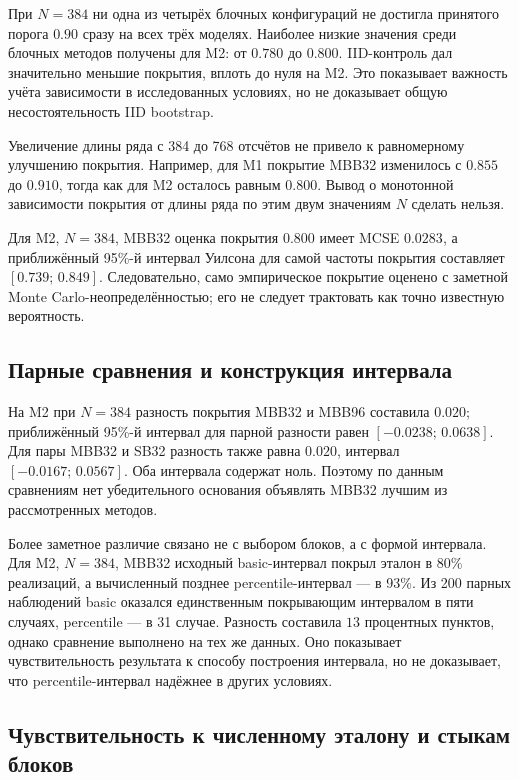 При $N=384$ ни одна из четырёх блочных конфигураций не достигла принятого порога $0.90$ сразу на всех трёх моделях. Наиболее низкие значения среди блочных методов получены для M2: от $0.780$ до $0.800$. IID-контроль дал значительно меньшие покрытия, вплоть до нуля на M2. Это показывает важность учёта зависимости в исследованных условиях, но не доказывает общую несостоятельность IID bootstrap.

Увеличение длины ряда с 384 до 768 отсчётов не привело к равномерному улучшению покрытия. Например, для M1 покрытие MBB32 изменилось с $0.855$ до $0.910$, тогда как для M2 осталось равным $0.800$. Вывод о монотонной зависимости покрытия от длины ряда по этим двум значениям $N$ сделать нельзя.

Для M2, $N=384$, MBB32 оценка покрытия $0.800$ имеет MCSE $0.0283$, а приближённый 95\%-й интервал Уилсона для самой частоты покрытия составляет $[0.739;\,0.849]$. Следовательно, само эмпирическое покрытие оценено с заметной Monte Carlo-неопределённостью; его не следует трактовать как точно известную вероятность.

\subsection{Парные сравнения и конструкция интервала}

На M2 при $N=384$ разность покрытия MBB32 и MBB96 составила $0.020$; приближённый 95\%-й интервал для парной разности равен $[-0.0238;\,0.0638]$. Для пары MBB32 и SB32 разность также равна $0.020$, интервал $[-0.0167;\,0.0567]$. Оба интервала содержат ноль. Поэтому по данным сравнениям нет убедительного основания объявлять MBB32 лучшим из рассмотренных методов.

Более заметное различие связано не с выбором блоков, а с формой интервала. Для M2, $N=384$, MBB32 исходный basic-интервал покрыл эталон в 80\% реализаций, а вычисленный позднее percentile-интервал --- в 93\%. Из 200 парных наблюдений basic оказался единственным покрывающим интервалом в пяти случаях, percentile --- в 31 случае. Разность составила $13$ процентных пунктов, однако сравнение выполнено на тех же данных. Оно показывает чувствительность результата к способу построения интервала, но не доказывает, что percentile-интервал надёжнее в других условиях.

\subsection{Чувствительность к численному эталону и стыкам блоков}

